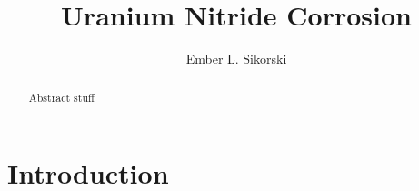 \documentclass[3p,review,11pt]{elsarticle}
\begin{document}
\begin{frontmatter}
	\title{Uranium Nitride Corrosion}
	
	\author[boise]{Ember L. Sikorski}
	
	
	\address[boise]{Boise State University}
	
	\begin{abstract}
Abstract stuff
	\end{abstract}	
	
\end{frontmatter}


\section{Introduction}
\end{document}
